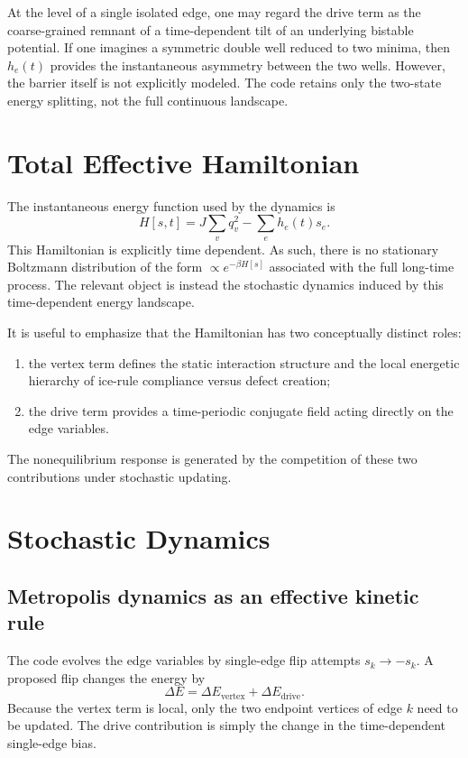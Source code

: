 \documentclass[11pt]{article}
\begin{document}
At the level of a single isolated edge, one may regard the drive term as the
coarse-grained remnant of a time-dependent tilt of an underlying bistable
potential. If one imagines a symmetric double well reduced to two minima, then
$h_e(t)$ provides the instantaneous asymmetry between the two wells. However,
the barrier itself is not explicitly modeled. The code retains only the
two-state energy splitting, not the full continuous landscape.

\section{Total Effective Hamiltonian}

The instantaneous energy function used by the dynamics is
\[
  H[s,t] = J\sum_v q_v^2 - \sum_e h_e(t)s_e.
\]
This Hamiltonian is explicitly time dependent. As such, there is no stationary
Boltzmann distribution of the form $\propto e^{-\beta H[s]}$ associated with
the full long-time process. The relevant object is instead the stochastic
dynamics induced by this time-dependent energy landscape.

It is useful to emphasize that the Hamiltonian has two conceptually distinct
roles:

\begin{enumerate}
\item the vertex term defines the static interaction structure and the local
energetic hierarchy of ice-rule compliance versus defect creation;
\item the drive term provides a time-periodic conjugate field acting directly on
the edge variables.
\end{enumerate}

The nonequilibrium response is generated by the competition of these two
contributions under stochastic updating.

\section{Stochastic Dynamics}

\subsection{Metropolis dynamics as an effective kinetic rule}

The code evolves the edge variables by single-edge flip attempts
$s_k \to -s_k$. A proposed flip changes the energy by
\[
  \Delta E = \Delta E_{\mathrm{vertex}} + \Delta E_{\mathrm{drive}}.
\]
Because the vertex term is local, only the two endpoint vertices of edge $k$
need to be updated. The drive contribution is simply the change in the
time-dependent single-edge bias.
\end{document}
